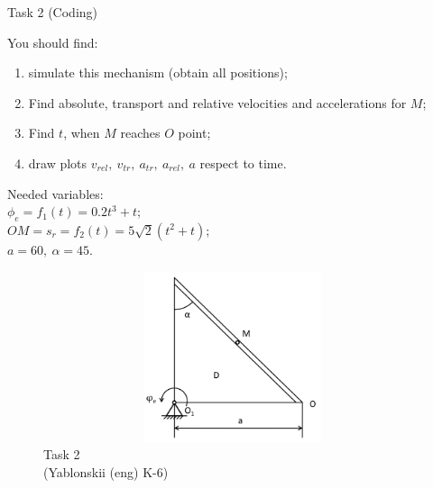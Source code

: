 \documentclass[aspectratio=169]{beamer}
\newcommand{\fbckg}[1]{\usebackgroundtemplate{\texttt{[image: \#1]}}}%
\begin{document}
  \begin{frame}[t]{Task 2 (Coding)}
    \begin{minipage}{0.65\textwidth}
      You should find:
      \begin{enumerate}
          \item simulate this mechanism (obtain all positions);
          \item Find absolute, transport and relative velocities and accelerations for $M$;
          \item Find $t$, when $M$ reaches $O$ point;
          \item draw plots $v_{rel},\ v_{tr},\ a_{tr},\ a_{rel},\ a$ respect to time.
      \end{enumerate}
      Needed variables:\\
      $\phi_e=f_1(t)=0.2t^3+t$;\\
      $OM=s_r=f_2(t)=5\sqrt{2}(t^2+t)$;\\
      $a=60,\ \alpha = 45$.
    \end{minipage}
    \begin{minipage}{0.34\textwidth}
      \begin{figure}[H]
        \centering\includegraphics[height=5cm,width=0.99\textwidth,keepaspectratio]{HW3_2}
        \caption*{Task 2 \\ (Yablonskii (eng) K-6)}
      \end{figure}
    \end{minipage}
  \end{frame}

\fbckg{fibeamer/figs/last_page.png}
\frame[plain]{}
\end{document}
